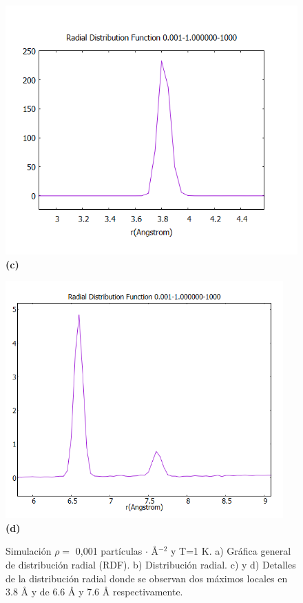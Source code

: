 \begin{figure}[H]
	
	\begin{minipage}[b]{0.45\textwidth}
		\centering
		\includegraphics[width=\textwidth]{grafico_3x02_0.001-1_zoom.png} %
		\textbf{(c)}
	\end{minipage}%
	\hfill
	\begin{minipage}[b]{0.45\textwidth}
		\centering
		\includegraphics[width=0.95\textwidth]{grafico_3x03-0.001_1_minipico.png} %
		\textbf{(d)}
	\end{minipage}
	\caption{\footnotesize Simulación $\rho=$ 0,001 partículas $\cdot$ \AA$^{-2}$ y  T=1 K. a) Gráfica general de distribución radial (RDF). b) Distribución  radial. c)  y d) Detalles de la distribución radial donde se observan dos máximos locales en 3.8 \AA {} y de 6.6 \AA {} y 7.6 \AA {} respectivamente.}
	\label{fig:rdf001t1}
\end{figure}
	
